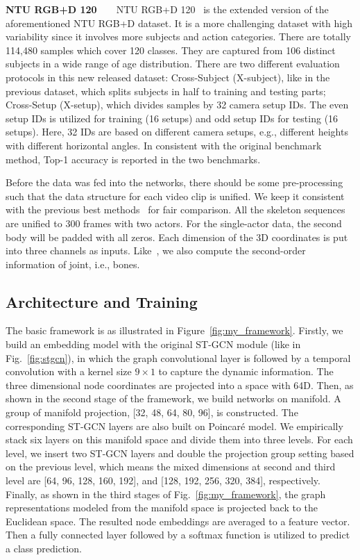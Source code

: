\documentclass[letterpaper]{article} \usepackage{aaai19}  \usepackage{times}  \usepackage{helvet} \usepackage{courier}  \usepackage[hyphens]{url}  \usepackage{graphicx} \urlstyle{rm} \def\UrlFont{\rm}  \usepackage{graphicx}  \frenchspacing  \setlength{\pdfpagewidth}{8.5in}  \setlength{\pdfpageheight}{11in}
\begin{document}
\textbf{NTU RGB+D 120}~~~~NTU RGB+D 120~\cite{liu2019ntu} is the extended version of the aforementioned NTU RGB+D dataset. It is a more challenging dataset with high variability since it involves more subjects and action categories. There are totally 114,480 samples which cover 120 classes. They are captured from 106 distinct subjects in a wide range of age distribution. There are two different evaluation protocols in this new released dataset: Cross-Subject (X-subject), like in the previous dataset, which splits subjects in half to training and testing parts; Cross-Setup (X-setup), which divides samples by 32 camera setup IDs. The even setup IDs is utilized for training (16 setups) and odd setup IDs for testing (16 setups). Here, 32 IDs are based on different camera setups, e.g., different heights with different horizontal angles. In consistent with the original benchmark method, Top-1 accuracy is reported in the two benchmarks. 

Before the data was fed into the networks, there should be some pre-processing such that the data structure for each video clip is unified. We keep it consistent with the previous best methods~\cite{shi2019two,peng2020learning} for fair comparison. All the skeleton sequences are unified to 300 frames with two actors. For the single-actor data, the second body  will be padded with all zeros. Each dimension of the 3D coordinates is put into three channels as inputs. Like~\cite{shi2019two,peng2020learning}, we also compute the second-order information of joint, i.e., bones.

\subsection{Architecture and Training}

The basic framework is as illustrated in Figure~\ref{fig:my_framework}. Firstly, we build an embedding model with the original ST-GCN module (like in Fig.~\ref{fig:stgcn}), in which the graph convolutional layer is followed by a temporal convolution with a kernel size $9\times 1$ to capture the dynamic information. The three dimensional node coordinates are projected into a space with 64D.   Then, as shown in the second stage of the framework, we build networks on manifold. A group of manifold projection, [32, 48, 64, 80, 96], is constructed. The corresponding ST-GCN layers are also built on Poincar\'e model. We empirically stack six layers on this manifold space and divide them into three levels. For each level, we insert two ST-GCN layers and double the projection group setting based on the previous level, which means the mixed dimensions at second and third level are [64, 96, 128, 160, 192], and [128, 192, 256, 320, 384], respectively. Finally, as shown in the third stages of Fig.~\ref{fig:my_framework}, the graph representations modeled from the manifold space is projected back to the Euclidean space. The resulted node embeddings are averaged to a feature vector. Then a fully connected layer followed by a softmax function is utilized to predict a class prediction. 
\end{document}
